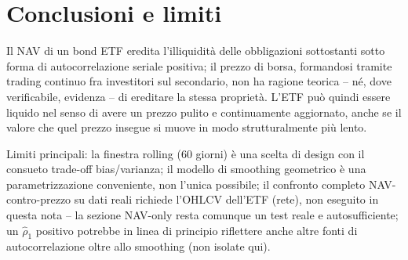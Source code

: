 \documentclass[11pt]{article}
\begin{document}
\section{Conclusioni e limiti}

Il NAV di un bond ETF eredita l'illiquidit\`a delle obbligazioni sottostanti sotto forma di autocorrelazione seriale positiva; il prezzo di borsa, formandosi tramite trading continuo fra investitori sul secondario, non ha ragione teorica -- n\'e, dove verificabile, evidenza -- di ereditare la stessa propriet\`a. L'ETF pu\`o quindi essere liquido nel senso di avere un prezzo pulito e continuamente aggiornato, anche se il valore che quel prezzo insegue si muove in modo strutturalmente pi\`u lento.

Limiti principali: la finestra rolling (60 giorni) \`e una scelta di design con il consueto trade-off bias/varianza; il modello di smoothing geometrico \`e una parametrizzazione conveniente, non l'unica possibile; il confronto completo NAV-contro-prezzo su dati reali richiede l'OHLCV dell'ETF (rete), non eseguito in questa nota -- la sezione NAV-only resta comunque un test reale e autosufficiente; un $\hat\rho_1$ positivo potrebbe in linea di principio riflettere anche altre fonti di autocorrelazione oltre allo smoothing (non isolate qui).
\end{document}
